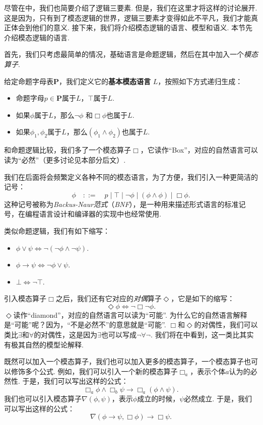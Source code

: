 尽管在中，我们也简要介绍了逻辑三要素. 但是，我们在这里才将这样的讨论展开. 这是因为，只有到了模态逻辑的世界，逻辑三要素才变得如此不平凡，我们才能真正体会到他们的意义. 接下来，我们将介绍模态逻辑的语言、模型和语义. 本节先介绍模态逻辑的语言. 

首先，我们只考虑最简单的情况，基础语言是命题逻辑，然后在其中加入一个\emph{模态算子}. 

\begin{definition}[基本模态语言]
给定命题字母表$\mathbf P$，我们定义它的\textbf{基本模态语言} $L$，按照如下方式递归生成：
\begin{itemize}
    \item 命题字母$p\in \mathbf P$属于$L$，$\top$属于$L$. 
    \item 如果$\phi$属于$L$，那么$\neg\phi$ 和$\Box\phi$也属于$L$. 
    \item 如果$\phi_1,\phi_2$属于$L$，那么$(\phi_1\wedge\phi_2)$也属于$L$. 
\end{itemize}
\end{definition}

和命题逻辑比较，我们多了一个模态算子$\Box$，它读作“Box”，对应的自然语言可以读为“必然”（更多讨论见本部分后文）. 

我们在后面将会频繁定义各种不同的模态语言，为了方便，我们引入一种更简洁的记号：
\[\phi\quad::=\quad p\mid \top\mid \neg\phi\mid (\phi\wedge\phi)\mid \Box\phi.\]
这种记号被称为\emph{Backus-Naur范式}（\emph{BNF}），是一种用来描述形式语言的标准记号，在编程语言设计和编译器的实现中也经常使用. 

类似命题逻辑，我们有如下缩写：
\begin{itemize}
    \item $\phi\vee\psi\iff\neg(\neg \phi\wedge\neg\psi)$.
    \item $\phi\to\psi\iff\neg\phi\vee\psi$.
    \item $\bot\iff\neg\top$.
\end{itemize}

引入模态算子$\Box$之后，我们还有它对应的\emph{对偶}算子$\Diamond$，它是如下的缩写：
\[\Diamond\phi\iff\neg\Box\neg\phi.\]
$\Diamond$读作“diamond”，对应的自然语言可以读为“可能”. 为什么它的自然语言解释是“可能”呢？因为，“不是必然不”的意思就是“可能”. $\Box$和$\Diamond$的对偶性，我们可以类比$\exists$和$\forall$的对偶性，这是因为$\exists$也可以写成$\neg\forall\neg$. 我们将在中看到，这一类比其实有极其自然的模型论解释. 

既然可以加入一个模态算子，我们也可以加入更多的模态算子，一个模态算子也可以修饰多个公式. 例如，我们可以引入一个新的模态算子$\Box_a$，表示个体$a$认为的必然性. 于是，我们可以写出这样的公式：
\[\Box_a\phi\wedge\Box_b\psi\to\Box_a(\phi\wedge\psi).\]
我们也可以引入模态算子$\nabla(\phi,\psi)$，表示$\phi$成立的时候，$\psi$必然成立. 于是，我们可以写出这样的公式：
\[\nabla(\phi\to\psi,\Box\phi)\to\Box\psi.\]


